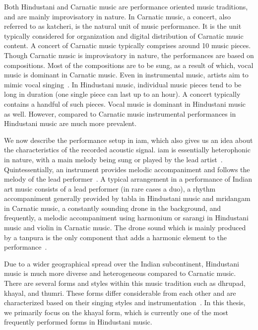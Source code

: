 Both Hindustani and Carnatic music are performance oriented music traditions, and are mainly improvisatory in nature. In Carnatic music, a concert, also referred to as \gls{katcheri}, is the natural unit of music performance. It is the unit typically considered for organization and digital distribution of Carnatic music content. A concert of Carnatic music typically comprises around 10 music pieces. Though Carnatic music is improvisatory in nature, the performances are based on compositions. Most of the compositions are to be sung, as a result of which, vocal music is dominant in Carnatic music. Even in instrumental music, artists aim to mimic vocal singing~\citep{Viswanathan2004}. In Hindustani music, individual music pieces tend to be long in duration (one single piece can last up to an hour). A concert typically contains a handful of such pieces. Vocal music is dominant in Hindustani music as well. However, compared to Carnatic music instrumental performances in Hindustani music are much more prevalent. 

We now describe the performance setup in \gls{iam}, which also gives us an idea about the characteristics of the recorded acoustic signal. \gls{iam} is essentially heterophonic in nature, with a main melody being sung or played by the lead artist~\citep{Bagchee1998}. Quintessentially, an instrument provides melodic accompaniment and follows the melody of the lead performer~\citep{Viswanathan2004}. A typical arrangement in a performance of Indian art music consists of a lead performer (in rare cases a duo), a rhythm accompaniment generally provided by \gls{tabla} in Hindustani music and \gls{mridangam} in Carnatic music, a constantly sounding drone in the background, and frequently, a melodic accompaniment using harmonium or \gls{sarangi} in Hindustani music and violin in Carnatic music. The drone sound which is mainly produced by a \gls{tanpura} is the only component that adds a harmonic element to the performance~\citep{Bagchee1998}. %

Due to a wider geographical spread over the Indian subcontinent, Hindustani music is much more diverse and heterogeneous compared to Carnatic music. There are several forms and styles within this music tradition such as \gls{dhrupad}, \gls{khayal}, and \gls{thumri}. These forms differ considerable from each other and are characterized based on their singing styles and instrumentation~\citep{Bor2010}. In this thesis, we primarily focus on the \gls{khayal} form, which is currently one of the most frequently performed forms in Hindustani music. 

